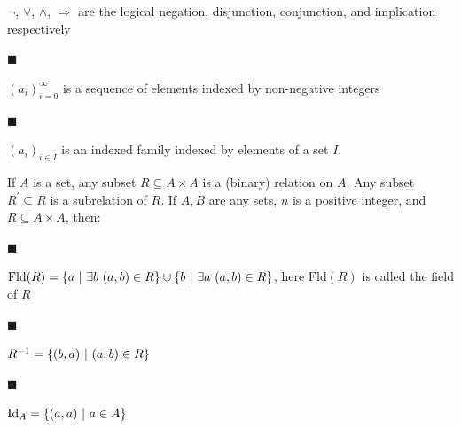 \documentclass[10pt,a4paper]{amsart}
\begin{document}
$\neg$, $\vee$, $\wedge$, $\Rightarrow$ are the logical negation, disjunction, conjunction, and implication respectively\par
 
 
 
\par\noindent  $\blacksquare$ 
 
$(a_{i})_{i=0}^{\infty}$ is a sequence of elements indexed by non-negative integers\par
 
 
 
\par\noindent  $\blacksquare$ 
 
$(a_{i})_{i\in I}$ is an indexed family indexed by elements of a set $I$.\par
 
 
  
 
 
If $A$ is a set, any subset $R\subseteq A\times A$ is a (binary) relation on $A$. Any subset $R^{\prime}\subseteq R$ is a subrelation of $R$. If $A,B$ are any sets, $n$ is a positive integer, and $R\subseteq A\times A$, then:\par
  
\par\noindent  $\blacksquare$ 
 
$\mathrm{Fld}(R)=\{a\leavevmode\nobreak\ |\leavevmode\nobreak\ \exists b%
\leavevmode\nobreak\ (a,b)\in R\}\cup\{b\leavevmode\nobreak\ |\leavevmode%
\nobreak\ \exists a\leavevmode\nobreak\ (a,b)\in R\}$, here $\mathrm{Fld}(R)$ is called the field of $R$\par
 
 
 
\par\noindent  $\blacksquare$ 
 
$R^{-1}=\{(b,a)\leavevmode\nobreak\ |\leavevmode\nobreak\ (a,b)\in R\}$\par
 
 
 
\par\noindent  $\blacksquare$ 
 
$\mathrm{Id}_{A}=\{(a,a)\leavevmode\nobreak\ |\leavevmode\nobreak\ a\in A\}$\par
 
\end{document}
